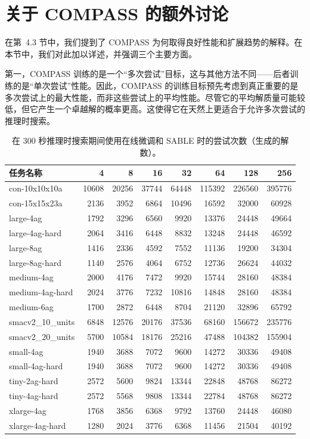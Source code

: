 \documentclass[11pt,UTF8,fontset=fandol]{ctexart}
\begin{document}
\section{关于 COMPASS 的额外讨论}

在第~4.3 节中，我们提到了 COMPASS 为何取得良好性能和扩展趋势的解释。在本节中，我们对此加以详述，并强调三个主要方面。

第一，COMPASS 训练的是一个“多次尝试”目标，这与其他方法不同——后者训练的是“单次尝试”性能。因此，COMPASS 的训练目标预先考虑到真正重要的是多次尝试上的最大性能，而非这些尝试上的平均性能。尽管它的平均解质量可能较低，但它产生一个卓越解的概率更高。这使得它在天然上更适合于允许多次尝试的推理时搜索。

\begin{table}[H]\centering
\caption{在 300 秒推理时搜索期间使用在线微调和 SABLE 时的尝试次数（生成的解数）。}
\label{tab:12}
\small
\begin{tabular}{lrrrrrrr}
\toprule
任务名称 & 4 & 8 & 16 & 32 & 64 & 128 & 256\\
\midrule
con-10x10x10a & 10608 & 20256 & 37744 & 64448 & 115392 & 226560 & 395776\\
con-15x15x23a & 2136 & 3952 & 6864 & 10496 & 16592 & 32000 & 60928\\
large-4ag & 1792 & 3296 & 6560 & 9920 & 13376 & 24448 & 49664\\
large-4ag-hard & 2064 & 3416 & 6448 & 8832 & 13248 & 24448 & 46592\\
large-8ag & 1416 & 2336 & 4592 & 7552 & 11136 & 19200 & 34304\\
large-8ag-hard & 1140 & 2576 & 4064 & 6752 & 12736 & 26624 & 44032\\
medium-4ag & 2000 & 4176 & 7472 & 9920 & 15744 & 28160 & 48384\\
medium-4ag-hard & 2024 & 3776 & 7232 & 10816 & 14848 & 28160 & 48384\\
medium-6ag & 1700 & 2872 & 6448 & 8704 & 21120 & 32896 & 65792\\
smacv2\_10\_units & 6848 & 12576 & 20176 & 37536 & 68160 & 156672 & 235776\\
smacv2\_20\_units & 5700 & 10584 & 18176 & 25216 & 47488 & 104382 & 155904\\
small-4ag & 1940 & 3688 & 7072 & 9600 & 14272 & 30336 & 49408\\
small-4ag-hard & 1940 & 3688 & 7072 & 9600 & 14272 & 30336 & 49408\\
tiny-2ag-hard & 2572 & 5600 & 9824 & 13344 & 22848 & 48768 & 86272\\
tiny-4ag-hard & 2572 & 5568 & 9808 & 13344 & 22784 & 48768 & 86272\\
xlarge-4ag & 1768 & 3856 & 6368 & 9792 & 13760 & 24448 & 46080\\
xlarge-4ag-hard & 1280 & 2024 & 3776 & 6368 & 11456 & 21504 & 40192\\
\bottomrule
\end{tabular}
\end{table}
\end{document}
